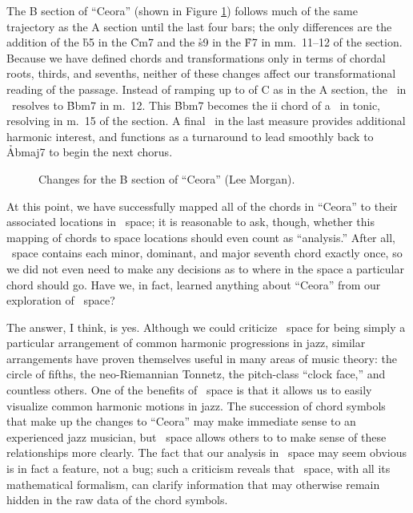 The B section of ``Ceora'' (shown in Figure \ref{tf:ceora-changes-2}) follows
much of the same trajectory as the A section until the last four bars; the
only differences are the addition of the \h{b5} in the \h{Cm7} and the \h{s9}
in the \h{F7} in mm.~11--12 of the section. Because we have defined chords and
transformations only in terms of chordal roots, thirds, and sevenths, neither
of these changes affect our transformational reading of the passage. Instead
of ramping up to \ii of C as in the A section, the \tf\ in \Bflat\
resolves to \h{Bbm7} in m.~12. This \h{Bbm7} becomes the ii chord of a \tfo\
in tonic, resolving in m.~15 of the section. A final \tf\ in the last measure
provides additional harmonic interest, and functions as a turnaround to lead
smoothly back to \h{Abmaj7} to begin the next chorus.

\begin{figure}[tbp]
  \caption{Changes for the B section of ``Ceora'' (Lee Morgan).}
  \label{tf:ceora-changes-2}
\end{figure}

At this point, we have successfully mapped all of the chords in ``Ceora'' to
their associated locations in \tf\ space; it is reasonable to ask, though,
whether this mapping of chords to space locations should even count as
``analysis.'' After all, \tf\ space contains each minor, dominant, and major
seventh chord exactly once, so we did not even need to make any decisions as
to where in the space a particular chord should go. Have we, in fact, learned
anything about ``Ceora'' from our exploration of \tf\ space?

The answer, I think, is yes. Although we could criticize \tf\ space for being
simply a particular arrangement of common harmonic progressions in jazz,
similar arrangements have proven themselves useful in many areas of music
theory: the circle of fifths, the neo-Riemannian Tonnetz, the pitch-class
``clock face,'' and countless others.\fn{tf-12} One of the benefits of \tf\
space is that it allows us to easily visualize common harmonic motions in jazz. The
succession of chord symbols that make up the changes to ``Ceora'' may make
immediate sense to an experienced jazz musician, but \tf\ space allows others
to to make sense of these relationships more clearly. The fact that our
analysis in \tf\ space may seem obvious is in fact a feature, not a bug; such
a criticism reveals that \tf\ space, with all its mathematical formalism,
can clarify information that may otherwise remain hidden in the raw data of
the chord symbols.\fn{tf-13}

